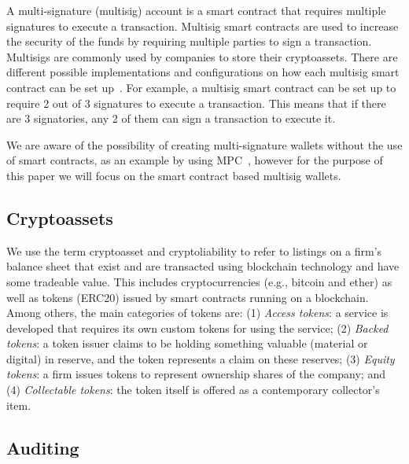 

A multi-signature (multisig) account is a smart contract that requires multiple signatures to execute a transaction. Multisig smart contracts are used to increase the security of the funds by requiring multiple parties to sign a transaction. Multisigs are commonly used by companies to store their cryptoassets. There are different possible implementations and configurations on how each multisig smart contract can be set up~\cite{ittay2021wallet}. For example, a multisig smart contract can be set up to require 2 out of 3 signatures to execute a transaction. This means that if there are 3 signatories, any 2 of them can sign a transaction to execute it.

We are aware of the possibility of creating multi-signature wallets without the use of smart contracts, as an example by using MPC~\cite{zhao2019secure}, however for the purpose of this paper we will focus on the smart contract based multisig wallets.

\subsection{Cryptoassets}
We use the term cryptoasset and cryptoliability to refer to listings on a firm's balance sheet that exist and are transacted using blockchain technology and have some tradeable value. This includes cryptocurrencies (e.g., bitcoin and ether) as well as tokens (\eg ERC20) issued by smart contracts running on a blockchain. Among others, the main categories of tokens are: (1) \textit{Access tokens}: a service is developed that requires its own custom tokens for using the service; (2) \textit{Backed tokens}: a token issuer claims to be holding something valuable (material or digital) in reserve, and the token represents a claim on these reserves; (3) \textit{Equity tokens}: a firm issues tokens to represent ownership shares of the company; and (4) \textit{Collectable tokens}: the token itself is offered as a contemporary collector's item. 


\subsection{Auditing}





